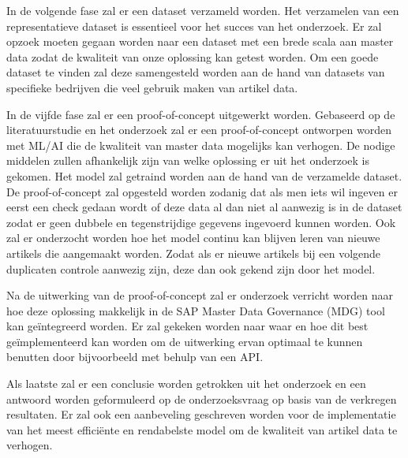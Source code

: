 In de volgende fase zal er een dataset verzameld worden. Het verzamelen van een representatieve dataset is essentieel voor het succes van het onderzoek. Er zal opzoek moeten gegaan worden naar een dataset met een brede scala aan master data zodat de kwaliteit van onze oplossing kan getest worden. Om een goede dataset te vinden zal deze samengesteld worden aan de hand van datasets van specifieke bedrijven die veel gebruik maken van artikel data.

In de vijfde fase zal er een proof-of-concept uitgewerkt worden. Gebaseerd op de literatuurstudie en het onderzoek zal er een proof-of-concept ontworpen worden met ML/AI die de kwaliteit van master data mogelijks kan verhogen. De nodige middelen zullen afhankelijk zijn van welke oplossing er uit het onderzoek is gekomen. Het model zal getraind worden aan de hand van de verzamelde dataset. De proof-of-concept zal opgesteld worden zodanig dat als men iets wil ingeven er eerst een check gedaan wordt of deze data al dan niet al aanwezig is in de dataset zodat er geen dubbele en tegenstrijdige gegevens ingevoerd kunnen worden. Ook zal er onderzocht worden hoe het model continu kan blijven leren van nieuwe artikels die aangemaakt worden. Zodat als er nieuwe artikels bij een volgende duplicaten controle aanwezig zijn, deze dan ook gekend zijn door het model.

Na de uitwerking van de proof-of-concept zal er onderzoek verricht worden naar hoe deze oplossing makkelijk in de SAP Master Data Governance (MDG) tool kan geïntegreerd worden. Er zal gekeken worden naar waar en hoe dit best geïmplementeerd kan worden om de uitwerking ervan optimaal te kunnen benutten door bijvoorbeeld met behulp van een API.

Als laatste zal er een conclusie worden getrokken uit het onderzoek en een antwoord worden geformuleerd op de onderzoeksvraag op basis van de verkregen resultaten. Er zal ook een aanbeveling geschreven worden voor de implementatie van het meest efficiënte en rendabelste model om de kwaliteit van artikel data te verhogen.

